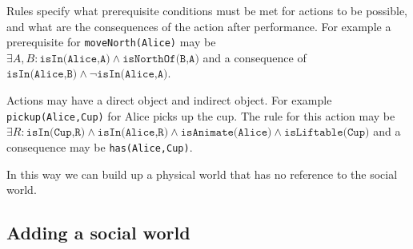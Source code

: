 \documentclass[a4paper]{article}
\begin{document}
Rules specify what prerequisite conditions must be met for actions to be possible, and what are the consequences of the action after performance. For example a prerequisite for \texttt{moveNorth(Alice)} may be $\exists A,B: \texttt{isIn(Alice,A)} \wedge \texttt{isNorthOf(B,A)}$ and a consequence of $\texttt{isIn(Alice,B)} \wedge \neg \texttt{isIn(Alice,A)}$.

Actions may have a direct object and indirect object. For example \texttt{pickup(Alice,Cup)} for Alice picks up the cup. The rule for this action may be $\exists R: \texttt{isIn(Cup,R)} \wedge \texttt{isIn(Alice,R)} \wedge \texttt{isAnimate(Alice)} \wedge \texttt{isLiftable(Cup)}$ and a consequence may be \texttt{has(Alice,Cup)}. 

In this way we can build up a physical world that has no reference to the social world.

\subsection{Adding a social world}

 
\end{document}
